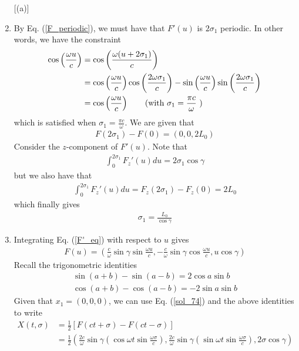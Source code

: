 \documentclass[11pt]{article}
\begin{document}
\begin{enumerate} [(a)]
    \item By Eq. (\ref{F_periodic}), we must have that $F'(u)$ is $2\sigma_1$ periodic. In other words, we have the constraint
    \begin{align*}
        \cos \left(\frac{\omega u}{c}\right) &= \cos \left(\frac{\omega (u+2\sigma_1)}{c}\right) \\
        &= \cos \left( \frac{\omega u}{c} \right) \cos \left( \frac{2\omega \sigma_1}{c}\right) - \sin \left( \frac{\omega u}{c} \right) \sin \left( \frac{2\omega \sigma_1}{c}\right) \\
        &= \cos \left( \frac{\omega u}{c}\right) \tag{with $\sigma_1 = \dfrac{\pi c}{\omega}$ }
    \end{align*}
    which is satisfied when $\sigma_1 = \frac{\pi c}{\omega}$. We are given that 
    \begin{align*}
        F(2 \sigma_1) - F(0) = (0, 0, 2L_0)
    \end{align*}
    Consider the $z$-component of $F'(u)$. Note that 
    \begin{align*}
        \int_0^{2\sigma_1} F_z'(u) du = 2\sigma_1 \cos \gamma
    \end{align*}
    but we also have that 
    \begin{align*}
        \int_0^{2\sigma_1} F_z'(u) du = F_z(2\sigma_1) - F_z(0) = 2L_0
    \end{align*}
    which finally gives 
    \begin{align}
        \sigma_1 = \frac{L_0}{\cos \gamma } \label{sigma_1}
    \end{align}

    \item Integrating Eq. (\ref{F'_eq}) with respect to $u$ gives 
    \begin{align*}
        F(u) = \left( \frac{c}{\omega} \sin \gamma \sin \frac{\omega u}{c}, -\frac{c}{\omega} \sin \gamma \cos \frac{\omega u}{c}, u\cos \gamma \right)
    \end{align*}
    Recall the trigonometric identities 
    \begin{align*}
        \sin(a+b) - \sin(a-b) = 2\cos a \sin b \\
        \cos(a+b) - \cos(a-b) = -2 \sin a \sin b
    \end{align*}
    Given that $x_1 = (0,0,0)$, we can use Eq. (\ref{sol_74}) and the above identities to write 
    \begin{align*}
        X(t, \sigma) &= \frac{1}{2}[F(ct + \sigma) - F(ct - \sigma)] \\
        &= \frac{1}{2} \left( \frac{2c}{\omega} \sin \gamma \left(\cos \omega t  \sin \frac{\omega \sigma}{c} \right), \frac{2c}{\omega} \sin \gamma \left( \sin \omega t \sin \frac{\omega \sigma }{c} \right), 2\sigma \cos \gamma\right)
    \end{align*}


\end{enumerate}
\end{document}
